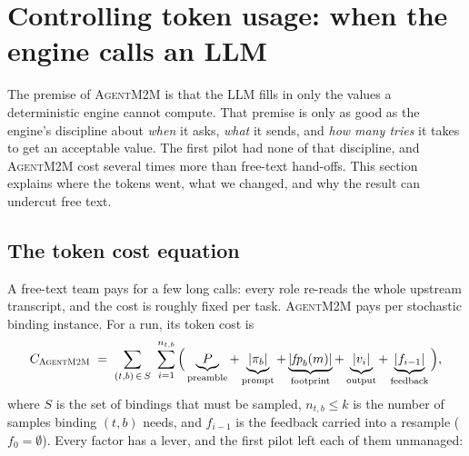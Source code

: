 \documentclass[10pt,a4paper]{article}
\newcommand{\tool}{\textsc{AgentM2M}}
\newcommand{\fp}{\mathit{fp}}
\theoremstyle{definition}
\begin{document}
\section{Controlling token usage: when the engine calls an LLM}\label{sec:tokens}

The premise of \tool{} is that the LLM fills in only the values a
deterministic engine cannot compute. That premise is only as good as the
engine's discipline about \emph{when} it asks, \emph{what} it sends, and
\emph{how many tries} it takes to get an acceptable value. The first pilot
had none of that discipline, and \tool{} cost several times more than
free-text hand-offs. This section explains where the tokens went, what we
changed, and why the result can undercut free text.

\subsection{The token cost equation}

A free-text team pays for a few long calls: every role re-reads the whole
upstream transcript, and the cost is roughly fixed per task. \tool{} pays per
stochastic binding instance. For a run, its token cost is
\[
C_{\tool{}} \;=\; \sum_{(t,b)\,\in\,S}\ \sum_{i=1}^{n_{t,b}}
\Big(\underbrace{P}_{\text{preamble}} + \underbrace{|\pi_b|}_{\text{prompt}}
+ \underbrace{|\fp_b(m)|}_{\text{footprint}} + \underbrace{|v_i|}_{\text{output}}
+ \underbrace{|f_{i-1}|}_{\text{feedback}}\Big),
\]
where $S$ is the set of bindings that must be sampled, $n_{t,b}\le k$ is the
number of samples binding $(t,b)$ needs, and $f_{i-1}$ is the feedback
carried into a resample ($f_0=\emptyset$). Every factor has a lever, and the
first pilot left each of them unmanaged:
\end{document}
